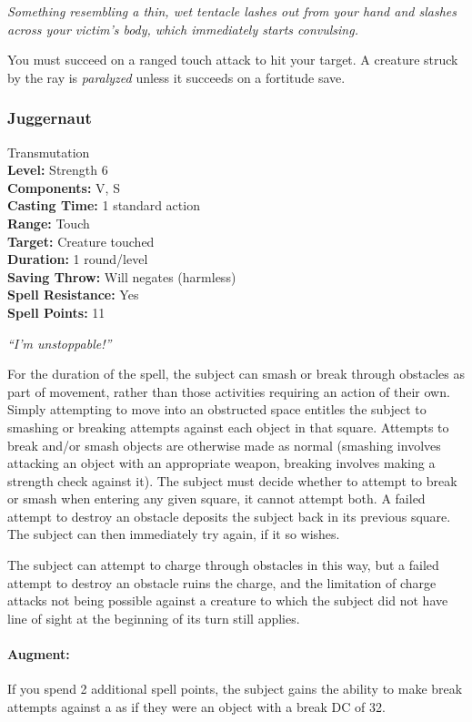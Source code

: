 \emph{Something resembling a thin, wet tentacle lashes out from your hand and slashes across your victim's body, which immediately starts convulsing.} 

You must succeed on a ranged touch attack to hit your target. A creature struck by the ray is \emph{paralyzed} unless it succeeds on a fortitude save.

\subsubsection{Juggernaut}
\label{Spell:Juggernaut}
Transmutation
\\ \textbf{Level:} Strength 6
\\ \textbf{Components:} V, S
\\ \textbf{Casting Time:} 1 standard action
\\ \textbf{Range:} Touch
\\ \textbf{Target:} Creature touched
\\ \textbf{Duration:} 1 round/level
\\ \textbf{Saving Throw:} Will negates (harmless)
\\ \textbf{Spell Resistance:} Yes
\\ \textbf{Spell Points:} 11

\emph{``I'm unstoppable!''}

For the duration of the spell, the subject can smash or break through obstacles as part of movement, rather than those activities requiring an action of their own.
Simply attempting to move into an obstructed space entitles the subject to smashing or breaking attempts against each object in that square.
Attempts to break and/or smash objects are otherwise made as normal (smashing involves attacking an object with an appropriate weapon, breaking involves making a strength check against it).
The subject must decide whether to attempt to break or smash when entering any given square, it cannot attempt both.
A failed attempt to destroy an obstacle deposits the subject back in its previous square.
The subject can then immediately try again, if it so wishes.

The subject can attempt to charge through obstacles in this way, but a failed attempt to destroy an obstacle ruins the charge, and the limitation of charge attacks not being possible against a creature to which the subject did not have line of sight at the beginning of its turn still applies.

\paragraph{Augment:} If you spend 2 additional spell points, the subject gains the ability to make break attempts against a  as if they were an object with a break DC of 32.

